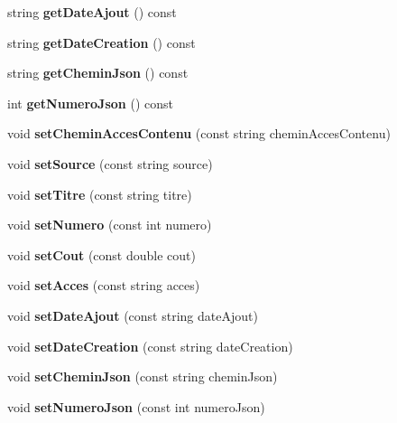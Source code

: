 \begin{DoxyCompactItemize}
string {\bfseries get\+Date\+Ajout} () const
\item 
\mbox{\label{classImage_a59571b7d36af2c2a0ff553c69fbf434e}} 
string {\bfseries get\+Date\+Creation} () const
\item 
\mbox{\label{classImage_a965f20b1954c34b66f4305a64057b83a}} 
string {\bfseries get\+Chemin\+Json} () const
\item 
\mbox{\label{classImage_a31c367a43f59d5cb5532895682b54a12}} 
int {\bfseries get\+Numero\+Json} () const
\item 
\mbox{\label{classImage_a166056aae96c9a1ed2583a37cebc3776}} 
void {\bfseries set\+Chemin\+Acces\+Contenu} (const string chemin\+Acces\+Contenu)
\item 
\mbox{\label{classImage_a4962730c7e64fc855331abfefe78c71a}} 
void {\bfseries set\+Source} (const string source)
\item 
\mbox{\label{classImage_ab94150e0ae2bed161ef0729d00b2ae3f}} 
void {\bfseries set\+Titre} (const string titre)
\item 
\mbox{\label{classImage_a0aede129a0cdb1b8b845b1d27441dbdb}} 
void {\bfseries set\+Numero} (const int numero)
\item 
\mbox{\label{classImage_a54a56d863db927bd571ea9454c59675f}} 
void {\bfseries set\+Cout} (const double cout)
\item 
\mbox{\label{classImage_a981d48145e7a992a31eaf89f23bc97ef}} 
void {\bfseries set\+Acces} (const string acces)
\item 
\mbox{\label{classImage_ad57fc0ca68953fab964470e8483401fb}} 
void {\bfseries set\+Date\+Ajout} (const string date\+Ajout)
\item 
\mbox{\label{classImage_ac8bfa20b9a4aaef136887dcaa35b535b}} 
void {\bfseries set\+Date\+Creation} (const string date\+Creation)
\item 
\mbox{\label{classImage_a88f9812d5d398c0c43e1a8459988e6d4}} 
void {\bfseries set\+Chemin\+Json} (const string chemin\+Json)
\item 
\mbox{\label{classImage_adbc5725b556cfa1add11e80da79117ed}} 
void {\bfseries set\+Numero\+Json} (const int numero\+Json)
\end{DoxyCompactItemize}
